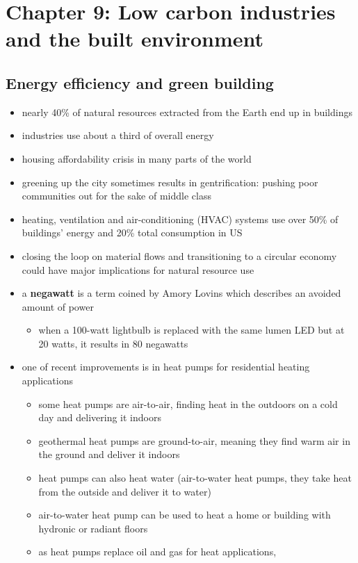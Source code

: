\section{Chapter 9: Low carbon industries and the built environment}

\subsection{Energy efficiency and green building}
\begin{itemize}
	\item nearly 40\% of natural resources extracted from the Earth end up
	in buildings
	\item industries use about a third of overall energy
	\item housing affordability crisis in many parts of the world
	\item greening up the city sometimes results in gentrification: pushing
	poor communities out for the sake of middle class
	\item heating, ventilation and air-conditioning (HVAC) systems use over
	50\% of buildings' energy and 20\% total consumption in US
	\item closing the loop on material flows and transitioning to a
	circular economy could have major implications for natural resource
	use
	\item a \textbf{negawatt} is a term coined by Amory Lovins which
	describes an avoided amount of power
	\begin{itemize}
		\item when a 100-watt lightbulb is replaced with the same
		lumen LED but at 20 watts, it results in 80 negawatts
	\end{itemize}
	\item one of recent improvements is in heat pumps for residential
	heating applications
	\begin{itemize}
		\item some heat pumps are air-to-air, finding heat in the
		outdoors on a cold day and delivering it indoors
		\item geothermal heat pumps are ground-to-air, meaning they
		find warm air in the ground and deliver it indoors
		\item heat pumps can also heat water (air-to-water heat pumps,
		they take heat from the outside and deliver it to water)
		\item air-to-water heat pump can be used to heat a home or
		building with hydronic or radiant floors
		\item as heat pumps replace oil and gas for heat applications,

\end{itemize}
\end{itemize}
